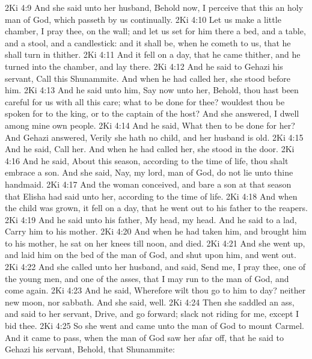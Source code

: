 \vs 2Ki 4:9 And she said unto her husband, Behold now, I perceive that this  an holy man of God, which passeth by us continually.
\vs 2Ki 4:10 Let us make a little chamber, I pray thee, on the wall; and let us set for him there a bed, and a table, and a stool, and a candlestick: and it shall be, when he cometh to us, that he shall turn in thither.
\vs 2Ki 4:11 And it fell on a day, that he came thither, and he turned into the chamber, and lay there.
\vs 2Ki 4:12 And he said to Gehazi his servant, Call this Shunammite. And when he had called her, she stood before him.
\vs 2Ki 4:13 And he said unto him, Say now unto her, Behold, thou hast been careful for us with all this care; what  to be done for thee? wouldest thou be spoken for to the king, or to the captain of the host? And she answered, I dwell among mine own people.
\vs 2Ki 4:14 And he said, What then  to be done for her? And Gehazi answered, Verily she hath no child, and her husband is old.
\vs 2Ki 4:15 And he said, Call her. And when he had called her, she stood in the door.
\vs 2Ki 4:16 And he said, About this season, according to the time of life, thou shalt embrace a son. And she said, Nay, my lord,  man of God, do not lie unto thine handmaid.
\vs 2Ki 4:17 And the woman conceived, and bare a son at that season that Elisha had said unto her, according to the time of life.
\vs 2Ki 4:18 And when the child was grown, it fell on a day, that he went out to his father to the reapers.
\vs 2Ki 4:19 And he said unto his father, My head, my head. And he said to a lad, Carry him to his mother.
\vs 2Ki 4:20 And when he had taken him, and brought him to his mother, he sat on her knees till noon, and  died.
\vs 2Ki 4:21 And she went up, and laid him on the bed of the man of God, and shut  upon him, and went out.
\vs 2Ki 4:22 And she called unto her husband, and said, Send me, I pray thee, one of the young men, and one of the asses, that I may run to the man of God, and come again.
\vs 2Ki 4:23 And he said, Wherefore wilt thou go to him to day?  neither new moon, nor sabbath. And she said,  well.
\vs 2Ki 4:24 Then she saddled an ass, and said to her servant, Drive, and go forward; slack not  riding for me, except I bid thee.
\vs 2Ki 4:25 So she went and came unto the man of God to mount Carmel. And it came to pass, when the man of God saw her afar off, that he said to Gehazi his servant, Behold,  that Shunammite:
